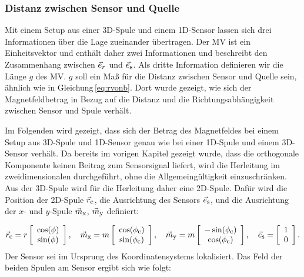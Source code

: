 \subsubsection{Distanz zwischen Sensor und Quelle}
Mit einem Setup aus einer 3D-Spule und einem 1D-Sensor lassen sich drei Informationen über die Lage zueinander übertragen. Der MV ist ein Einheitsvektor und enthält daher zwei Informationen und beschreibt den Zusammenhang zwischen $\vec{e}_{\textrm{\footnotesize{$r$}}}$ und $\vec{e}_{\textrm{\footnotesize{s}}}$. Als dritte Information definieren wir die Länge $g$ des MV. $g$ soll ein Maß für die Distanz zwischen Sensor und Quelle sein, ähnlich wie in Gleichung\,\ref{eq:rvonb}. Dort wurde gezeigt, wie sich der Magnetfeldbetrag in Bezug auf die Distanz und die Richtungsabhängigkeit zwischen Sensor und Spule verhält.
        
Im Folgenden wird gezeigt, dass sich der Betrag des Magnetfeldes bei einem Setup aus 3D-Spule und 1D-Sensor genau wie bei einer 1D-Spule und einem 3D-Sensor verhält. Da bereits im vorigen Kapitel gezeigt wurde, dass die orthogonale Komponente keinen Beitrag zum Sensorsignal liefert, wird die Herleitung im zweidimensionalen durchgeführt, ohne die Allgemeingültigkeit einzuschränken. Aus der 3D-Spule wird für die Herleitung daher eine 2D-Spule. Dafür wird die Position der 2D-Spule $\vec{r}_{\textrm{\footnotesize{c}}}$, die Ausrichtung des Sensors $\vec{e}_{\textrm{\footnotesize{s}}}$, und die Ausrichtung der $x$- und $y$-Spule $\vec{m}_{\textrm{\footnotesize{x}}}$, $\vec{m}_{\textrm{\footnotesize{y}}}$ definiert:

    \begin{equation}
        \vec{r}_{\textrm{\footnotesize{c}}} = r \left[\begin{array}{c} \cos(\phi)\\ \sin(\phi) \end{array}\right],\quad
        \vec{m}_{\textrm{\footnotesize{x}}} = m  \left[\begin{array}{c} \cos(\phi_{\textrm{\footnotesize{c}}}) \\ \sin(\phi_{\textrm{\footnotesize{c}}}) \end{array}\right],\quad
        \vec{m}_{\textrm{\footnotesize{y}}} = m \left[\begin{array}{c} -\sin(\phi_{\textrm{\footnotesize{c}}}) \\ \cos(\phi_{\textrm{\footnotesize{c}}}) \end{array}\right],\quad
        \vec{e}_{\textrm{\footnotesize{s}}} = \left[\begin{array}{c} 1\\ 0\end{array}\right].
        \label{eq:def_Vec_Abs}
    \end{equation}
Der Sensor sei im Ursprung des Koordinatensystems lokalisiert. Das Feld der beiden Spulen am Sensor ergibt sich wie folgt:


